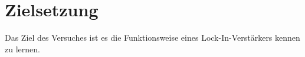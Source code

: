 \section{Zielsetzung}

Das Ziel des Versuches ist es die Funktionsweise eines Lock-In-Verstärkers kennen zu lernen.